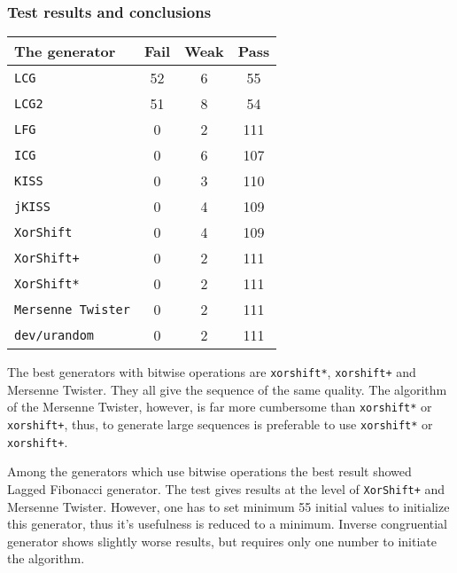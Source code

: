 \documentclass[%
floatfix,
showkeys,
nofootinbib, %
superscriptaddress, %
]{revtex4-1}
\begin{document}
\subsubsection{Test results and conclusions}

\begin{center}
    \begin{tabular}{ | l | c | c | c |}
    \hline
    \textbf{The generator} & \textbf{Fail} & \textbf{Weak} & \textbf{Pass} \\ \hline\hline
                \texttt{LCG} & 52 & 6 & 55 \\ \hline
                \texttt{LCG2} & 51 & 8 & 54 \\ \hline
                \texttt{LFG} & 0 & 2 & 111 \\ \hline
                \texttt{ICG}  & 0 & 6 & 107 \\ \hline
                \texttt{KISS} & 0 & 3 & 110 \\ \hline
                \texttt{jKISS} & 0 & 4 & 109 \\ \hline
                \texttt{XorShift} & 0 & 4 & 109 \\ \hline
                \texttt{XorShift+} & 0 & 2 & 111  \\ \hline
                \texttt{XorShift*} & 0 & 2 & 111 \\ \hline
                \texttt{Mersenne Twister} & 0 & 2 & 111 \\ \hline
                \texttt{dev/urandom} & 0 & 2 & 111              \\ \hline
    \hline
    \end{tabular}
\end{center}

The best generators with bitwise operations are \texttt{xorshift*},
\texttt{xorshift+} and Mersenne Twister. They all give the sequence of
the same quality. The algorithm of the Mersenne Twister, however, is
far more cumbersome than \texttt{xorshift*} or \texttt{xorshift+},
thus, to generate large sequences is preferable to use
\texttt{xorshift*} or \texttt{xorshift+}.

Among the generators which use bitwise operations the best result
showed Lagged Fibonacci generator. The test gives results at the level
of \texttt{XorShift+} and Mersenne Twister. However, one has to set
minimum 55 initial values to initialize this generator, thus it's
usefulness is reduced to a minimum. Inverse congruential generator
shows slightly worse results, but requires only one number to initiate
the algorithm.
\end{document}
